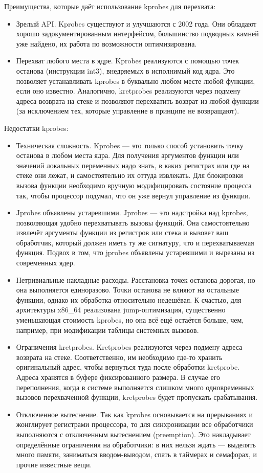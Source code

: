 Преимущества, которые даёт использование kprobes для перехвата:
\begin{itemize}
	\item Зрелый API. Kprobes существуют и улучшаются с 2002 года. Они обладают хорошо задокументированным интерфейсом, большинство подводных камней уже найдено, их работа по возможности оптимизирована.
	\item Перехват любого места в ядре. Kprobes реализуются с помощью точек останова (инструкции int3), внедряемых в исполнимый код ядра. Это позволяет устанавливать kprobes в буквально любом месте любой функции, если оно известно. Аналогично, kretprobes реализуются через подмену адреса возврата на стеке и позволяют перехватить возврат из любой функции (за исключением тех, которые управление в принципе не возвращают).
\end{itemize}

Недостатки kprobes:

\begin{itemize}
	\item Техническая сложность. Kprobes — это только способ установить точку останова в любом места ядра. Для получения аргументов функции или значений локальных переменных надо знать, в каких регистрах или где на стеке они лежат, и самостоятельно их оттуда извлекать. Для блокировки вызова функции необходимо вручную модифицировать состояние процесса так, чтобы процессор подумал, что он уже вернул управление из функции.
	\item Jprobes объявлены устаревшими. Jprobes — это надстройка над kprobes, позволяющая удобно перехватывать вызовы функций. Она самостоятельно извлечёт аргументы функции из регистров или стека и вызовет ваш обработчик, который должен иметь ту же сигнатуру, что и перехватываемая функция. Подвох в том, что jprobes объявлены устаревшими и вырезаны из современных ядер.
	\item Нетривиальные накладные расходы. Расстановка точек останова дорогая, но она выполняется единоразово. Точки останова не влияют на остальные функции, однако их обработка относительно недешёвая. К счастью, для архитектуры x86\_64 реализована jump-оптимизация, существенно уменьшающая стоимость kprobes, но она всё ещё остаётся больше, чем, например, при модификации таблицы системных вызовов.
	\item Ограничения kretprobes. Kretprobes реализуются через подмену адреса возврата на стеке. Соответственно, им необходимо где-то хранить оригинальный адрес, чтобы вернуться туда после обработки kretprobe. Адреса хранятся в буфере фиксированного размера. В случае его переполнения, когда в системе выполняется слишком много одновременных вызовов перехваченной функции, kretprobes будет пропускать срабатывания.
	\item Отключенное вытеснение. Так как kprobes основывается на прерываниях и жонглирует регистрами процессора, то для синхронизации все обработчики выполняются с отключенным вытеснением (preemption). Это накладывает определённые ограничения на обработчики: в них нельзя ждать — выделять много памяти, заниматься вводом-выводом, спать в таймерах и семафорах, и прочие известные вещи.
\end{itemize}

